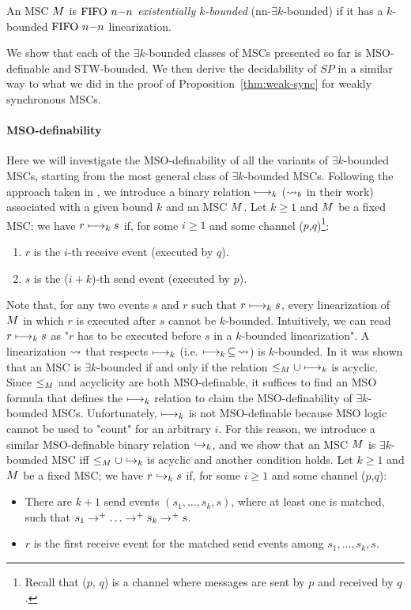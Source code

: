 \begin{definition}
	An MSC $M$ is \emph{$\text{FIFO } n\mathsf{-}n$ existentially $k$-bounded} (nn-$\exists k$-bounded) if it has a $k$-bounded $\text{FIFO } n\mathsf{-}n$ linearization.
\end{definition}

We show that each of the $\exists k$-bounded classes of MSCs presented so far is MSO-definable and STW-bounded. We then derive the decidability of $SP$ in a similar way to what we did in the proof of Proposition~\ref{thm:weak-sync} for weakly synchronous MSCs.

\paragraph*{MSO-definability}

Here we will investigate the MSO-definability of all the variants of $\exists k$-bounded MSCs, starting from the most general class of $\exists k$-bounded MSCs.
Following the approach taken in \cite{DBLP:conf/fossacs/LohreyM02}, we introduce a binary relation $\longmapsto_k$ ($\rightsquigarrow_b$ in their work) associated with a given bound $k$ and an MSC $M$. Let $k \ge 1$ and $M$ be a fixed MSC: we have $r \longmapsto_k s$ if, for some $i \ge 1$ and some channel ($p$,$q$)\footnote{Recall that ($p,\,q$) is a channel where messages are sent by $p$ and received by $q$.}:
\begin{enumerate}\itemsep=0.5ex
	\item $r$ is the $i$-th receive event (executed by $q$).
	\item $s$ is the ($i+k$)-th send event (executed by $p$).
\end{enumerate}
Note that, for any two events $s$ and $r$ such that $r \longmapsto_k s$, every linearization of $M$ in which $r$ is executed after $s$ cannot be $k$-bounded. Intuitively, we can read $r \longmapsto_k s$ as "$r$ has to be executed before $s$ in a $k$-bounded linearization". A linearization $\rightsquigarrow$ that respects $\longmapsto_k$ (i.e. $\longmapsto_k \,\subseteq\, \rightsquigarrow$) is $k$-bounded. In \cite{DBLP:conf/fossacs/LohreyM02} it was shown that an MSC is $\exists k$-bounded if and only if the relation $\le_M \cup \longmapsto_k$ is acyclic. Since $\le_M$ and acyclicity are both MSO-definable, it suffices to find an MSO formula that defines the $\longmapsto_k$ relation to claim the MSO-definability of $\exists k$-bounded MSCs. Unfortunately, $\longmapsto_k$ is not MSO-definable because MSO logic cannot be used to "count" for an arbitrary $i$. For this reason, we introduce a similar MSO-definable binary relation $\hookrightarrow_{k}$, and we show that an MSC $M$ is $\exists k$-bounded MSC iff $\le_M \cup \hookrightarrow_{k}$ is acyclic and another condition holds. Let $k \ge 1$ and $M$ be a fixed MSC; we have $r \hookrightarrow_{k} s$ if, for some $i \ge 1$ and some channel ($p$,$q$):
\begin{itemize}\itemsep=0.5ex
	\item There are $k+1$ send events $(s_1, \dots, s_k, s)$, where at least one is matched, such that $s_1 \procrel^+ \dots \procrel^+ s_k \procrel^+ s$.
 	\item $r$ is the first receive event for the matched send events among $s_1, \dots, s_k, s$.
\end{itemize}

